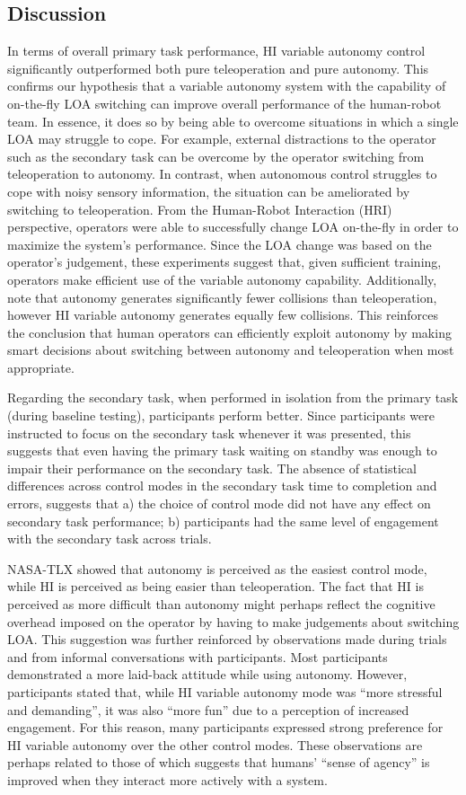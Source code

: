 \documentclass[a4paper,12pt,oneside,openright]{bhamthesis}
\begin{document}
\subsection{Discussion}

In terms of overall primary task performance, HI variable autonomy control significantly outperformed both pure teleoperation and pure autonomy. This confirms our hypothesis that a variable autonomy system with the capability of on-the-fly LOA switching can improve overall performance of the human-robot team. In essence, it does so by being able to overcome situations in which a single LOA may struggle to cope. For example, external distractions to the operator such as the secondary task can be overcome by the operator switching from teleoperation to autonomy. In contrast, when autonomous control struggles to cope with noisy sensory information, the situation can be ameliorated by switching to teleoperation. From the Human-Robot Interaction (HRI) perspective, operators were able to successfully change LOA on-the-fly in order to maximize the system's performance. Since the LOA change was based on the operator's judgement, these experiments suggest that, given sufficient training, operators make efficient use of the variable autonomy capability. Additionally, note that autonomy generates significantly fewer collisions than teleoperation, however HI variable autonomy generates equally few collisions. This reinforces the conclusion that human operators can efficiently exploit autonomy by making smart decisions about switching between autonomy and teleoperation when most appropriate. 

Regarding the secondary task, when performed in isolation from the primary task (during baseline testing), participants perform better. Since participants were instructed to focus on the secondary task whenever it was presented, this suggests that even having the primary task waiting on standby was enough to impair their performance on the secondary task. The absence of statistical differences across control modes in the secondary task time to completion and errors, suggests that a) the choice of control mode did not have any effect on secondary task performance; b) participants had the same level of engagement with the secondary task across trials.

NASA-TLX showed that autonomy is perceived as the easiest control mode, while HI is perceived as being easier than teleoperation. The fact that HI is perceived as more difficult than autonomy might perhaps reflect the cognitive overhead imposed on the operator by having to make judgements about switching LOA. This suggestion was further reinforced by observations made during trials and from informal conversations with participants. Most participants demonstrated a more laid-back attitude while using autonomy. However, participants stated that, while HI variable autonomy mode was ``more stressful and demanding'', it was also ``more fun'' due to a perception of increased engagement. For this reason, many participants expressed strong preference for HI variable autonomy over the other control modes. These observations are perhaps related to those of \citep{Wen2015} which suggests that humans' ``sense of agency'' is improved when they interact more actively with a system.
\end{document}
